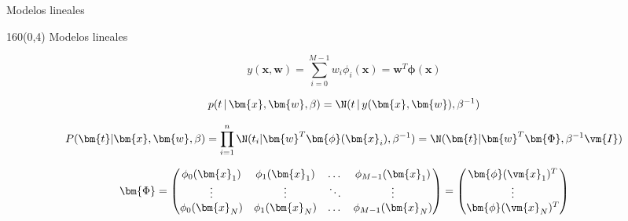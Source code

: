 \documentclass[shownotes,aspectratio=169]{beamer}
\begin{document}
%
%
%

\begin{frame}[plain]

\centering

\Large Modelos lineales

\end{frame}

\begin{frame}[plain]
\begin{textblock}{160}(0,4)
\centering \Large Modelos lineales
\end{textblock}
 \vspace{1.25cm}
 
\begin{equation*}
y(\bm{x},\bm{w}) = \sum_{i=0}^{M-1} w_i \phi_i(\bm{x}) = \bm{w}^T \bm{\phi}(\bm{x})
\end{equation*}

\vspace{0.5cm}
\pause
% 
 
 \begin{equation*}
p(t \, | \, \bm{x}, \bm{w}, \beta) = \N(t \, | \, y(\bm{x},\bm{w}) , \beta^{-1})
\end{equation*}
\vspace{0.025cm}
\pause
 
\begin{equation*}
P(\bm{t} | \bm{x}, \bm{w}, \beta) = \prod_{i=1}^n \N(t_i | \bm{w}^T \bm{\phi}(\bm{x}_i) , \beta^{-1}) = \N(\bm{t}|\bm{w}^T \bm{\Phi}, \beta^{-1} \vm{I})
\end{equation*}
\vspace{0.05cm}
\pause

\begin{equation*}
 \bm{\Phi} =
  \begin{pmatrix}
    \phi_0(\bm{x}_1) & \phi_1(\bm{x}_1) & \dots & \phi_{M-1}(\bm{x}_1)\\
    \vdots & \vdots & \ddots & \vdots \\
    \phi_0(\bm{x}_N) & \phi_1(\bm{x}_N) & \dots & \phi_{M-1}(\bm{x}_N)
  \end{pmatrix}
  = 
  \begin{pmatrix}
   \bm{\phi}(\vm{x}_1)^T \\
   \vdots \\
   \bm{\phi}(\vm{x}_N)^T \\
  \end{pmatrix}
\end{equation*}

 
\end{frame}
\end{document}
